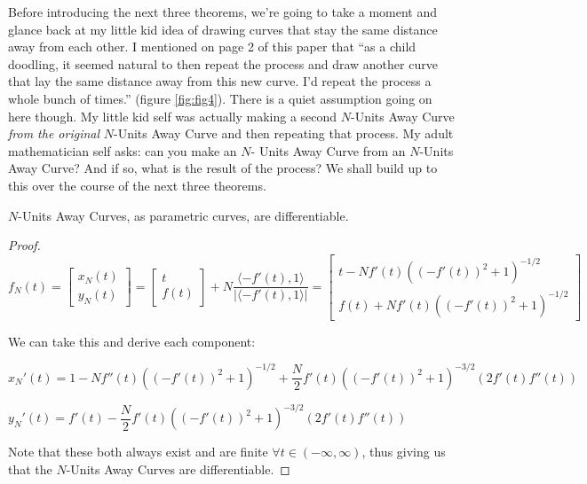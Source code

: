 Before introducing the next three theorems, we’re going to take a moment and glance back at my little kid idea of drawing curves that stay the same distance away from each other. I mentioned on page 2 of this paper that ``as a child doodling, it seemed natural to then
repeat the process and draw another curve that lay the same distance away from this new
curve. I’d repeat the process a whole bunch of times.'' (figure \ref{fig:fig4}). There is a quiet
assumption going on here though. My little kid
self was actually making a second $N$-Units Away
Curve \textit{from the original} $N$-Units Away Curve and then repeating that process. My adult
mathematician self asks: can you make an $N$-
Units Away Curve from an $N$-Units Away Curve?
And if so, what is the result of the process?
We shall build up to this over the course of the next three theorems.

\begin{myTrm}
    $N$-Units Away Curves, as parametric curves, are differentiable.
\end{myTrm}

\newcommand{\xNDer}{
    1 - N f''(t) ((-f'(t))^2 + 1)^{-1/2} + \dfrac{N}{2} f'(t) ( (-f'(t))^2 + 1) ^ {-3/2} (2 f'(t) f''(t))
}

\newcommand{\yNDer}{
    f'(t) - \dfrac{N}{2} f'(t) ((-f'(t))^2 + 1) ^ {-3/2} (2 f'(t) f''(t))
}

\begin{proof}

\begin{equation*}
    f_N(t) = \begin{bmatrix}
        x_N(t) \\ y_N(t)
    \end{bmatrix} =
    \begin{bmatrix}
        t \\ f(t)
    \end{bmatrix} +
    N \dfrac{\langle -f'(t), 1 \rangle}{|\langle -f'(t), 1 \rangle|} =
    \begin{bmatrix}
        t - N f'(t)((-f'(t))^2 + 1)^{-1/2}
        \\
        f(t) + N f'(t)((-f'(t))^2 + 1)^{-1/2}
    \end{bmatrix}
\end{equation*}

We can take this and derive each component:

$x_N'(t) = \xNDer$

$y_N'(t) = \yNDer$

Note that these both always exist and are finite $\forall t \in (- \infty, \infty)$, thus giving us that the $N$-Units Away Curves are differentiable.

\end{proof}

